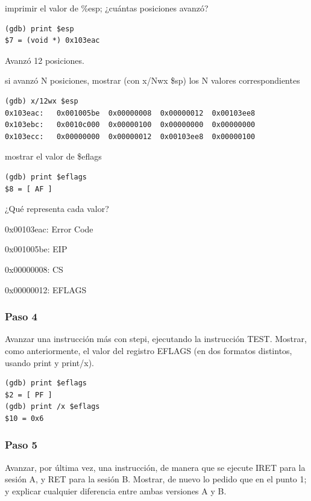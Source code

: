 \documentclass[a4paper]{article}
\begin{document}
\begin{list}{•}
\item imprimir el valor de \%esp; ¿cuántas posiciones avanzó?
\begin{lstlisting}
(gdb) print $esp
$7 = (void *) 0x103eac
\end{lstlisting}
Avanzó 12 posiciones.

\item si avanzó N posiciones, mostrar (con x/Nwx \$sp) los N valores correspondientes
\begin{lstlisting}
(gdb) x/12wx $esp
0x103eac:	0x001005be	0x00000008	0x00000012	0x00103ee8
0x103ebc:	0x0010c000	0x00000100	0x00000000	0x00000000
0x103ecc:	0x00000000	0x00000012	0x00103ee8	0x00000100
\end{lstlisting}

\item mostrar el valor de \$eflags
\begin{lstlisting}
(gdb) print $eflags
$8 = [ AF ]
\end{lstlisting}

¿Qué representa cada valor?
\begin{list}{•}{}
\item 0x00103eac: Error Code
\item 0x001005be: EIP
\item 0x00000008: CS
\item 0x00000012: EFLAGS
\end{list}

\end{list}

\subsubsection*{Paso 4} Avanzar una instrucción más con stepi, ejecutando la instrucción TEST. Mostrar, como anteriormente, el valor del registro EFLAGS (en dos formatos distintos, usando print y print/x).\newline

\begin{lstlisting}
(gdb) print $eflags
$2 = [ PF ]
(gdb) print /x $eflags
$10 = 0x6

\end{lstlisting}

\subsubsection*{Paso 5} Avanzar, por última vez, una instrucción, de manera que se ejecute IRET para la sesión A, y RET para la sesión B. Mostrar, de nuevo lo pedido que en el punto 1; y explicar cualquier diferencia entre ambas versiones A y B.
\end{document}
